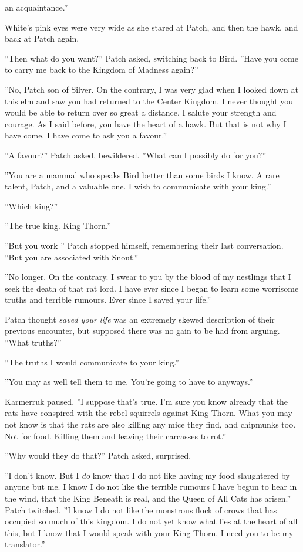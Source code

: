 \documentclass[11pt]{article}
\begin{document}
 an acquaintance.''\par
 White's pink eyes were very wide as she stared at Patch, and then the hawk, and back at Patch again.\par
 ''Then what do you want?'' Patch asked, switching back to Bird. ''Have you come to carry me back to the Kingdom of Madness again?''\par
 ''No, Patch son of Silver. On the contrary, I was very glad when I looked down at this elm and saw you had returned to the Center Kingdom. I never thought you would be able to return over so great a distance. I salute your strength and courage. As I said before, you have the heart of a hawk. But that is not why I have come. I have come to ask you a favour.''\par
 ''A favour?'' Patch asked, bewildered. ''What can I possibly do for you?''\par
 ''You are a mammal who speaks Bird better than some birds I know. A rare talent, Patch, and a valuable one. I wish to communicate with your king.''\par
 ''Which king?''\par
 ''The true king. King Thorn.''\par
 ''But you work %
'' Patch stopped himself, remembering their last conversation. ''But you are associated with Snout.''\par
 ''No longer. On the contrary. I swear to you by the blood of my nestlings that I seek the death of that rat lord. I have ever since I began to learn some worrisome truths and terrible rumours. Ever since I saved your life.''\par
 Patch thought {\it saved your life} was an extremely skewed description of their previous encounter, but supposed there was no gain to be had from arguing. ''What truths?''\par
 ''The truths I would communicate to your king.''\par
 ''You may as well tell them to me. You're going to have to anyways.''\par
 Karmerruk paused. ''I suppose that's true. I'm sure you know already that the rats have conspired with the rebel squirrels against King Thorn. What you may not know is that the rats are also killing any mice they find, and chipmunks too. Not for food. Killing them and leaving their carcasses to rot.''\par
 ''Why would they do that?'' Patch asked, surprised.\par
 ''I don't know. But I {\it do} know that I do not like having my food slaughtered by anyone but me. I know I do not like the terrible rumours I have begun to hear in the wind, that the King Beneath is real, and the Queen of All Cats has arisen.'' Patch twitched. ''I know I do not like the monstrous flock of crows that has occupied so much of this kingdom. I do not yet know what lies at the heart of all this, but I know that I would speak with your King Thorn. I need you to be my translator.''\par
\end{document}
